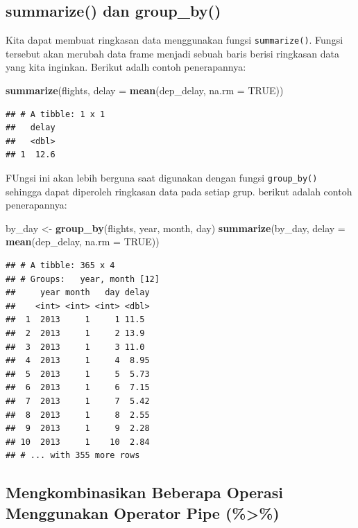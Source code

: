 \documentclass[]{book}
\newenvironment{Shaded}{\begin{snugshade}}{\end{snugshade}}
\newcommand{\KeywordTok}[1]{\textcolor[rgb]{0.13,0.29,0.53}{\textbf{#1}}}
\newcommand{\DataTypeTok}[1]{\textcolor[rgb]{0.13,0.29,0.53}{#1}}
\newcommand{\StringTok}[1]{\textcolor[rgb]{0.31,0.60,0.02}{#1}}
\newcommand{\OtherTok}[1]{\textcolor[rgb]{0.56,0.35,0.01}{#1}}
\newcommand{\NormalTok}[1]{#1}
\begin{document}
\subsection{summarize() dan group\_by()}\label{summarize-dan-group_by}

Kita dapat membuat ringkasan data menggunakan fungsi
\texttt{summarize()}. Fungsi tersebut akan merubah data frame menjadi
sebuah baris berisi ringkasan data yang kita inginkan. Berikut adalh
contoh penerapannya:

\begin{Shaded}
\begin{Highlighting}[]
\KeywordTok{summarize}\NormalTok{(flights, }\DataTypeTok{delay =} \KeywordTok{mean}\NormalTok{(dep_delay, }\DataTypeTok{na.rm =} \OtherTok{TRUE}\NormalTok{))}
\end{Highlighting}
\end{Shaded}

\begin{verbatim}
## # A tibble: 1 x 1
##   delay
##   <dbl>
## 1  12.6
\end{verbatim}

FUngsi ini akan lebih berguna saat digunakan dengan fungsi
\texttt{group\_by()} sehingga dapat diperoleh ringkasan data pada setiap
grup. berikut adalah contoh penerapannya:

\begin{Shaded}
\begin{Highlighting}[]
\NormalTok{by_day <-}\StringTok{ }\KeywordTok{group_by}\NormalTok{(flights, year, month, day)}
    \KeywordTok{summarize}\NormalTok{(by_day, }\DataTypeTok{delay =} \KeywordTok{mean}\NormalTok{(dep_delay, }\DataTypeTok{na.rm =} \OtherTok{TRUE}\NormalTok{))}
\end{Highlighting}
\end{Shaded}

\begin{verbatim}
## # A tibble: 365 x 4
## # Groups:   year, month [12]
##     year month   day delay
##    <int> <int> <int> <dbl>
##  1  2013     1     1 11.5 
##  2  2013     1     2 13.9 
##  3  2013     1     3 11.0 
##  4  2013     1     4  8.95
##  5  2013     1     5  5.73
##  6  2013     1     6  7.15
##  7  2013     1     7  5.42
##  8  2013     1     8  2.55
##  9  2013     1     9  2.28
## 10  2013     1    10  2.84
## # ... with 355 more rows
\end{verbatim}

\subsection{Mengkombinasikan Beberapa Operasi Menggunakan Operator Pipe
(\%\textgreater{}\%)}\label{mengkombinasikan-beberapa-operasi-menggunakan-operator-pipe}
\end{document}
